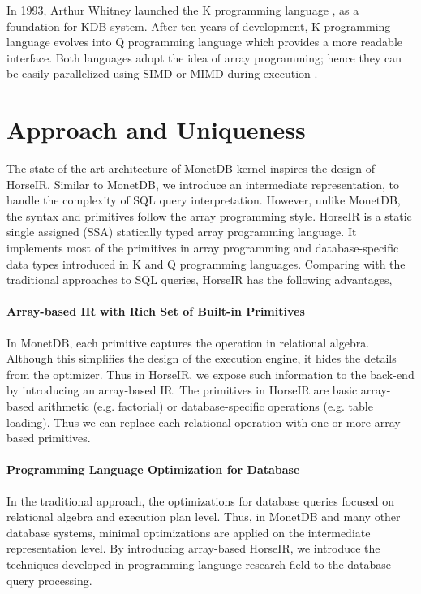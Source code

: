 \documentclass[sigplan]{acmart}
\begin{document}
In 1993, Arthur Whitney launched the K programming language
\cite{KLangTutorial} , as a foundation for KDB system. After ten years of
development, K programming language evolves into Q programming language
\cite{QLangTutorial} which provides a more readable interface. Both languages
adopt the idea of array programming; hence they can be easily parallelized
using SIMD or MIMD during execution \cite{HowFastCanAPLBe}. 



\section{Approach and Uniqueness}

The state of the art architecture of MonetDB kernel inspires the design of
HorseIR. Similar to MonetDB, we introduce an intermediate representation, to
handle the complexity of SQL query interpretation.  However, unlike MonetDB,
the syntax and primitives follow the array programming style. HorseIR is a
static single assigned (SSA) statically typed array programming language. It
implements most of the primitives in array programming and database-specific
data types introduced in K and Q programming languages. Comparing with the
traditional approaches to SQL queries, HorseIR has the following advantages,

\paragraph{Array-based IR with Rich Set of Built-in Primitives}
In MonetDB, each primitive captures the operation in relational algebra.
Although this simplifies the design of the execution engine, it hides the
details from the optimizer. Thus in HorseIR, we expose such information to the
back-end by introducing an array-based IR. The primitives in HorseIR are basic
array-based arithmetic (e.g. factorial) or database-specific operations (e.g.
table loading). Thus we can replace each relational operation with one or more
array-based primitives. 

\paragraph{Programming Language Optimization for Database}
In the traditional approach, the optimizations for database queries focused
on relational algebra and execution plan level. Thus, in MonetDB and many other
database systems, minimal optimizations are applied on the intermediate
representation level. By introducing array-based HorseIR, we introduce the
techniques developed in programming language research field to the database
query processing.
\end{document}
